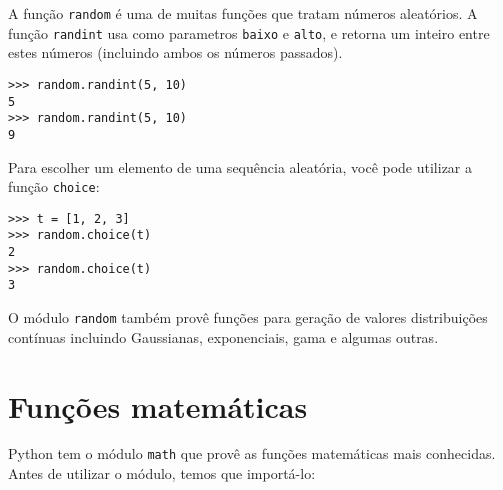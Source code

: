 
A função {\tt random} é uma de muitas funções que tratam números aleatórios.
A função {\tt randint} usa como parametros {\tt baixo} e {\tt alto}, e retorna
um inteiro entre estes números (incluindo ambos os números passados).


\beforeverb
\begin{verbatim}
>>> random.randint(5, 10)
5
>>> random.randint(5, 10)
9
\end{verbatim}
\afterverb
%

Para escolher um elemento de uma sequência aleatória, você pode utilizar a
função {\tt choice}:


\beforeverb
\begin{verbatim}
>>> t = [1, 2, 3]
>>> random.choice(t)
2
>>> random.choice(t)
3
\end{verbatim}
\afterverb
%
%
O módulo {\tt random} também provê funções para geração de valores
distribuições contínuas incluindo Gaussianas, exponenciais, gama e algumas
outras.

\section{Funções matemáticas}



Python tem o módulo {\tt math} que provê as funções matemáticas mais
conhecidas. Antes de utilizar o módulo, temos que importá-lo:

